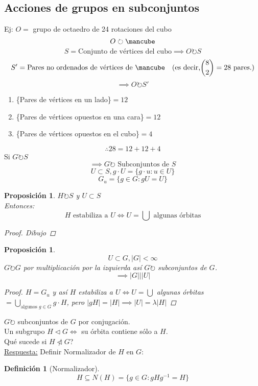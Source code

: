 \documentclass[11pt]{book}
\newcommand*\cube{\mbox{\mancube}}
\newtheorem{prop}[thm]{Proposición}
\theoremstyle{definition}
\newtheorem{defn}{Definición}[section]
\begin{document}
\subsection{Acciones de grupos en subconjuntos}
Ej: $O=$ grupo de octaedro de 24 rotaciones del cubo
\[O\circlearrowright\cube\]
\[S=\textrm{Conjunto de vértices del cubo}\implies O\circlearrowright S\]
\[S'=\textrm{Pares no ordenados de vértices de }\cube\quad(\textrm{es decir,}\binom{8}{2}=28\textrm{ pares.})\]
\[\implies O\circlearrowright S'\]
\begin{enumerate}[label=(\roman*)]
	\item \{Pares de vértices en un lado\}$=12$

	\item \{Pares de vértices opuestos en una cara\}$=12$

	\item \{Pares de vértices opuestos en el cubo\}$=4$
\end{enumerate}
\[\therefore 28=12+12+4\]
Si $G\circlearrowright S$
\[\implies G\circlearrowright\textrm{ Subconjuntos de }S\]
\[U\subset S, g\cdot U=\{g\cdot u:u\in U\}\]
\[G_u=\{g\in G:gU=U\}\]
\begin{prop}
	$H\circlearrowright S$ y $U\subset S$\\
	Entonces:
	\[H\textrm{ estabiliza a }U\iff U=\bigcup\textrm{ algunas órbitas}\]
	\begin{proof}
		Dibujo
	\end{proof}
\end{prop}
\begin{prop}
	\[U\subset G, |G|<\infty\]
	$G\circlearrowright G$ por multiplicación por la izquierda así $G\circlearrowright$ subconjuntos de $G$.
	\[\implies |G| | |U|\]
	\begin{proof}
		$H=G_u$ y así $H$ estabiliza a $U\iff U=\bigcup$ algunas órbitas $=\bigcup_{\textrm{algunos }g\in G}g\cdot H$, pero $|gH|=|H|\implies |U|=\lambda |H|$
	\end{proof}
\end{prop}
$G\circlearrowright$ subconjuntos de $G$ por conjugación.\\
Un subgrupo $H\triangleleft G\iff$ su órbita contiene sólo a $H$.\\
Qué sucede si $H\ntriangleleft G$?\\
\underline{Respuesta:} Definir Normalizador de $H$ en $G$:
\begin{defn}[Normalizador]
	\[H\subseteq N(H)=\{g\in G:gHg^{-1}=H\}\]
\end{defn}
\end{document}
